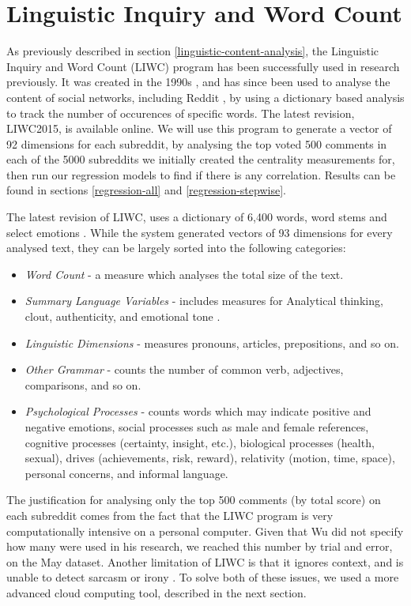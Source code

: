 \documentclass[bsc,frontabs,twoside,singlespacing,parskip,deptreport]{infthesis}
\begin{document}
\section{Linguistic Inquiry and Word Count}\label{liwc}

As previously described in section \ref{linguistic-content-analysis}, the Linguistic Inquiry and Word Count (LIWC) program has been successfully used in research previously. It was created in the 1990s \cite{liwc}, and has since been used to analyse the content of social networks, including Reddit \cite{ethayarajhKawin2017TEoP}, by using a dictionary based analysis to track the number of occurences of specific words. The latest revision, LIWC2015, is available online. We will use this program to generate a vector of 92 dimensions for each subreddit, by analysing the top voted 500 comments in each of the 5000 subreddits we initially created the centrality measurements for, then run our regression models to find if there is any correlation. Results can be found in sections \ref{regression-all} and \ref{regression-stepwise}.

The latest revision of LIWC, uses a dictionary of 6,400 words, word stems and select emotions \cite{pennebaker2015}. While the system generated vectors of 93 dimensions for every analysed text, they can be largely sorted into the following categories:

\begin{itemize}
	\item \textit{Word Count} - a measure which analyses the total size of the text.
	\item \textit{Summary Language Variables} - includes measures for Analytical thinking, clout, authenticity, and emotional tone .
	\item \textit{Linguistic Dimensions} - measures pronouns, articles, prepositions, and so on.
	\item \textit{Other Grammar} - counts the number of common verb, adjectives, comparisons, and so on.
	\item \textit{Psychological Processes} - counts words which may indicate positive and negative emotions, social processes such as male and female references, cognitive processes (certainty, insight, etc.), biological processes (health, sexual), drives (achievements, risk, reward), relativity (motion, time, space), personal concerns, and informal language.
\end{itemize}

The justification for analysing only the top 500 comments (by total score) on each subreddit comes from the fact that the LIWC program is very computationally intensive on a personal computer. Given that Wu \cite{masters} did not specify how many were used in his research, we reached this number by trial and error, on the May dataset. Another limitation of LIWC is that it ignores context, and is unable to detect sarcasm or irony \cite{liwc}. To solve both of these issues, we used a more advanced cloud computing tool, described in the next section.
\end{document}
